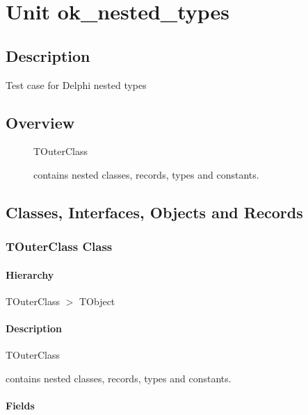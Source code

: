 \documentclass{report}
\begin{document}
\newlength{\tmplength}
\chapter{Unit ok{\_}nested{\_}types}
\section{Description}
Test case for Delphi nested types\hfill\vspace*{1ex}

 


\section{Overview}
\begin{description}
\item[\texttt{\begin{ttfamily}TOuterClass\end{ttfamily} Class}]\begin{ttfamily}TOuterClass\end{ttfamily} contains nested classes, records, types and constants.
\end{description}
\section{Classes, Interfaces, Objects and Records}
\subsection*{TOuterClass Class}
\subsubsection*{\large{\textbf{Hierarchy}}\normalsize\hspace{1ex}\hfill}
TOuterClass {$>$} TObject
\subsubsection*{\large{\textbf{Description}}\normalsize\hspace{1ex}\hfill}
\begin{ttfamily}TOuterClass\end{ttfamily} contains nested classes, records, types and constants.\subsubsection*{\large{\textbf{Fields}}\normalsize\hspace{1ex}\hfill}
\end{document}
